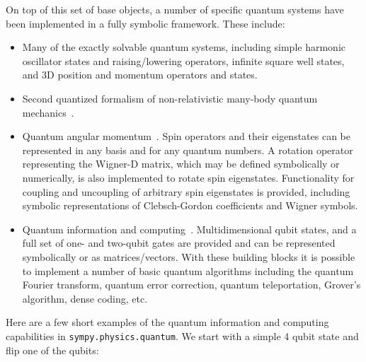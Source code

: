 On top of this set of base objects, a number of specific quantum systems have
been implemented in a fully symbolic framework. These include:

\begin{itemize}

\item Many of the exactly solvable quantum systems, including simple harmonic
oscillator states and raising/lowering operators, infinite square well states,
and 3D position and momentum operators and states.

\item Second quantized formalism of non-relativistic many-body quantum
mechanics~\cite{FetterWalecka2003}.

\item Quantum angular momentum~\cite{Zare1991}. Spin operators and their
eigenstates can be represented in any basis and for any quantum numbers.
A rotation operator representing the Wigner-D matrix, which may be defined
symbolically or numerically, is also implemented to rotate spin eigenstates.
Functionality for coupling and uncoupling of arbitrary spin eigenstates is
provided, including symbolic representations of Clebsch-Gordon coefficients and
Wigner symbols.

\item Quantum information and computing~\cite{Nielsen2011}. Multidimensional
qubit states, and a full set of one- and two-qubit gates are provided and can
be represented symbolically or as matrices/vectors. With these building blocks
it is possible to implement a number of basic quantum algorithms including the
quantum Fourier transform, quantum error correction, quantum teleportation,
Grover's algorithm, dense coding, etc.


\end{itemize}

Here are a few short examples of the quantum information and computing capabilities in \verb|sympy.physics.quantum|. We start with a simple 4 qubit state and flip one of the qubits:

